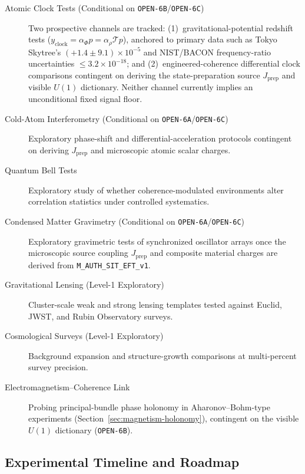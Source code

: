 \begin{description}
    \item[Atomic Clock Tests (Conditional on \texttt{OPEN-6B}/\texttt{OPEN-6C})] Two prospective channels are tracked: (1)~gravitational-potential redshift tests ($y_{\mathrm{clock}} = \alpha_\Phi p = \alpha_\rho\mathcal{T} p$), anchored to primary data such as Tokyo Skytree's $(+1.4\pm 9.1)\times 10^{-5}$ and NIST/BACON frequency-ratio uncertainties $\le 3.2\times 10^{-18}$; and (2)~engineered-coherence differential clock comparisons contingent on deriving the state-preparation source $J_{\mathrm{prep}}$ and visible $U(1)$ dictionary. Neither channel currently implies an unconditional fixed signal floor.

    \item[Cold-Atom Interferometry (Conditional on \texttt{OPEN-6A}/\texttt{OPEN-6C})] Exploratory phase-shift and differential-acceleration protocols contingent on deriving $J_{\mathrm{prep}}$ and microscopic atomic scalar charges.

    \item[Quantum Bell Tests] Exploratory study of whether coherence-modulated environments alter correlation statistics under controlled systematics.

    \item[Condensed Matter Gravimetry (Conditional on \texttt{OPEN-6A}/\texttt{OPEN-6C})] Exploratory gravimetric tests of synchronized oscillator arrays once the microscopic source coupling $J_{\mathrm{prep}}$ and composite material charges are derived from \texttt{M\_AUTH\_SIT\_EFT\_v1}.

    \item[Gravitational Lensing (Level-1 Exploratory)] Cluster-scale weak and strong lensing templates tested against Euclid, JWST, and Rubin Observatory surveys.

    \item[Cosmological Surveys (Level-1 Exploratory)] Background expansion and structure-growth comparisons at multi-percent survey precision.

    \item[Electromagnetism--Coherence Link] Probing principal-bundle phase holonomy in Aharonov--Bohm-type experiments (Section~\ref{sec:magnetism-holonomy}), contingent on the visible $U(1)$ dictionary (\texttt{OPEN-6B}).
\end{description}

\subsection{Experimental Timeline and Roadmap}

